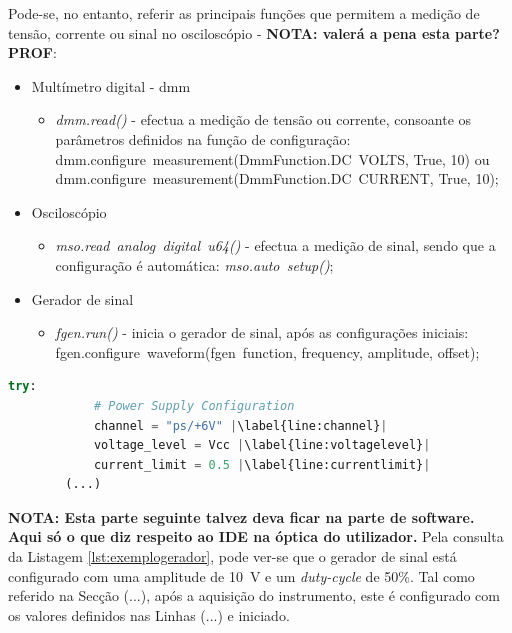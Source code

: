 Pode-se, no entanto, referir as principais funções que permitem a medição de tensão, corrente ou sinal no osciloscópio \cite{pyvirtualbench} - \textbf{NOTA: valerá a pena esta parte? PROF}:

\begin{itemize}
	\item Multímetro digital - \acrshort{dmm}
		\begin{itemize}
			\item \textit{dmm.read()} - efectua a medição de tensão ou corrente, consoante os parâmetros definidos na função de configuração: dmm.configure~\textunderscore measurement(DmmFunction.DC~\textunderscore VOLTS, True, 10) ou dmm.configure~\textunderscore measurement(DmmFunction.DC~\textunderscore CURRENT, True, 10);
		\end{itemize}
	\item Osciloscópio
	\begin{itemize}
		\item \textit{mso.read~\textunderscore analog~\textunderscore digital~\textunderscore u64()} - efectua a medição de sinal, sendo que a configuração é automática: \textit{mso.auto~\textunderscore setup()};
	\end{itemize}
	\item Gerador de sinal
	\begin{itemize}
		\item \textit{fgen.run()} - inicia o gerador de sinal, após as configurações iniciais:\\fgen.configure~\textunderscore waveform(fgen~\textunderscore function, frequency, amplitude, offset);
	\end{itemize}
\end{itemize}

\begin{minipage}{0.9\linewidth}
	\centering
	\begin{lstlisting}[language=Python, escapechar=|, caption=Configuração da fonte de \SI{6}{\volt}, label=lst:limiteI]
		try:
			# Power Supply Configuration
			channel = "ps/+6V" |\label{line:channel}|
			voltage_level = Vcc |\label{line:voltagelevel}|
			current_limit = 0.5 |\label{line:currentlimit}|
		(...)
	\end{lstlisting}
\end{minipage}

\textbf{NOTA: Esta parte seguinte talvez deva ficar na parte de software. Aqui só o que diz respeito ao IDE na óptica do utilizador.}
Pela consulta da Listagem \ref{lst:exemplogerador}, pode ver-se que o gerador de sinal está configurado com uma amplitude de \SI{10}{\volt} e um \textit{duty-cycle} de 50\%. Tal como referido na Secção (...), após a aquisição do instrumento, este é configurado com os valores definidos nas Linhas (...) e iniciado.

